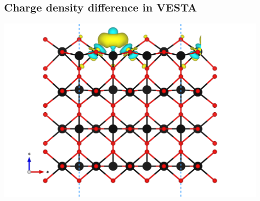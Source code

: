\documentclass[11pt]{article}
\begin{document}
\subsection{Charge density difference in VESTA}
\label{sec:org466d38b}
\begin{center}
\includegraphics[width=.9\linewidth]{./figures/VESTA/CHG-diff-Ovac-b.png}
\end{center}
\end{document}
